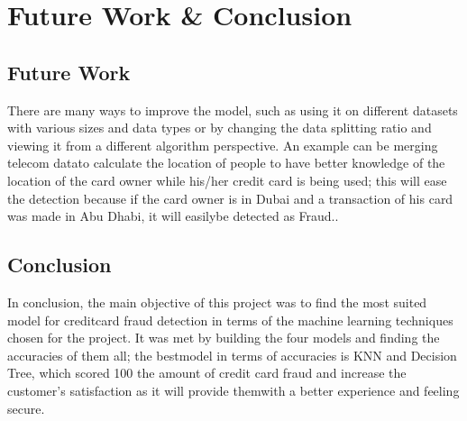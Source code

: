 \chapter{Future Work \& Conclusion}
\section{Future Work}
There are many ways to improve the model, such as using it on different datasets with various 
sizes and data types or by changing the data splitting ratio and viewing it from a different algorithm 
perspective. An example can be merging telecom datato calculate the location of people to have 
better knowledge of the location of the card owner while his/her credit card is being used; this will 
ease the detection because if the card owner is in Dubai and a transaction of his card was made in 
Abu Dhabi, it will easilybe detected as Fraud..

\section{Conclusion}
In conclusion, the main objective of this project was to find the most suited model for creditcard 
fraud detection in terms of the machine learning techniques chosen for the project. It was met by 
building the four models and finding the accuracies of them all; the bestmodel in terms of accuracies 
is KNN and Decision Tree, which scored 100%
the amount of credit card fraud and increase the customer's satisfaction as it will provide themwith 
a better experience and feeling secure.